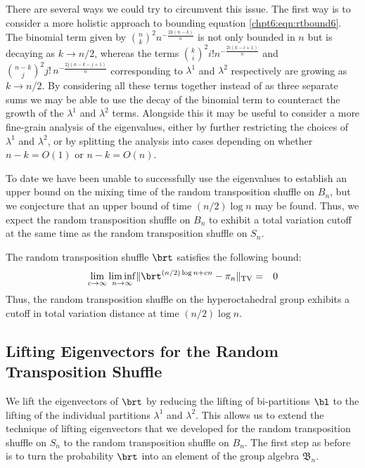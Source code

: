 \documentclass[11pt]{report}
\begin{document}
There are several ways we could try to circumvent this issue. The first way is to consider a more holistic approach to bounding equation \eqref{chpt6:eqn:rtbound6}. The binomial term given by 
${n \choose k}^{2}  n^{-\frac{2k(n-k)}{n}}$
is not only bounded in $n$ but is decaying as $k \to n/2$, whereas the terms ${k \choose i}^{2} i! n^{- \frac{2i(k-i+1)}{n}}$ and ${n-k \choose j}^{2} j! \, n^{ - \frac{2j(n-k-j+1)}{n}}$ corresponding to $\lambda^{1}$ and $\lambda^{2}$ respectively are growing as $k \to n/2$. By considering all these terms together  instead of as three separate sums we may be able to use the decay of the binomial term to counteract the growth of the  $\lambda^{1}$ and $\lambda^{2}$ terms.
Alongside this it may be useful to consider a more fine-grain analysis of the eigenvalues, either by further restricting the choices of $\lambda^{1}$ and $\lambda^{2}$, or by splitting the analysis into cases depending on whether $n-k = O(1)$ or $n-k = O(n)$.

To date we have been unable to successfully use the eigenvalues to establish an upper bound on the mixing time of the random transposition shuffle on $B_{n}$, but we conjecture that an upper bound of time $(n/2)\log n$ may be found. Thus, we expect the random transposition shuffle on $B_{n}$ to exhibit a total variation cutoff at the same time as the random transposition shuffle on $S_{n}$. 
\begin{conj}
	\label{chpt6:conj:upper}
	The random transposition shuffle $\brt$ satisfies the following bound:
	\begin{eqnarray}
	\lim_{c\to\infty} \liminf_{n\to\infty}\lVert \brt^{(n/2)\log n +c n} - \pi_{n} \rVert_{\tiny\textnormal{TV}} & = & 0  \label{chpt6:eqn:brtupperbound} 
	\end{eqnarray}
	Thus, the random transposition shuffle on the hyperoctahedral group exhibits a cutoff in total variation distance at time $(n/2)\log n$.
\end{conj}


\subsection{Lifting Eigenvectors for the Random Transposition Shuffle}
\label{chpt6:subsec:rtlifting}
We lift the eigenvectors of $\brt$ by reducing the lifting of bi-partitions $\bl$ to the lifting of the individual partitions $\lambda^{1}$ and $\lambda^{2}$. This allows us to extend the technique of lifting eigenvectors that we developed for the random transposition shuffle on $S_{n}$ to the random transposition shuffle on $B_{n}$. The first step as before is to turn the probability $\brt$ into an element of the group algebra $\mathfrak{B}_{n}$.
\end{document}
